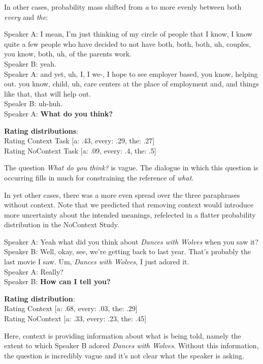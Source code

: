 \documentclass[12pt,letterpaper,table,svgnames,dvipsnames]{article}
\begin{document}
In other cases, probability mass shifted from \emph{a} to more evenly between both \emph{every} and \emph{the}:
\begin{exe}
    \ex {}
    \begin{xlist}
    \ex {}
    Speaker A: I mean, I'm just thinking of my circle of people that I know, I know quite a few people who have decided to not have both, both, both, uh, couples, you know, both, uh, of the parents work.\\
    Speaker B: yeah.\\
    Speaker A: and yet, uh, I, I we-, I hope to see employer based, you know, helping out. you know, child, uh, care centers at the place of employment and, and things like that, that will help out.\\
    Spealer B: uh-huh.\\
    Speaker A: \textbf{What do you think?}
    
    \ex \textbf{Rating distributions}:\\
    Rating Context Task [a: .43, every: .29, the: .27]\\
    Rating NoContext Task [a: .09, every: .4, the: .5]
    \end{xlist}
\end{exe}
The question \emph{What do you think?} is vague. The dialogue in which this question is occurring fills in much for constraining the reference of \emph{what}. 


In yet other cases, there was a more even spread over the three paraphrases without context. Note that we predicted that removing context would introduce more uncertainty about the intended meanings, refelected in a flatter probability distribution in the NoContext Study. 
\begin{exe}
    \ex {}
    \begin{xlist}
    \ex {}
    Speaker A: Yeah what did you think about \emph{Dances with Wolves} when you saw it?\\
    Speaker B: Well, okay, see, we're getting back to last year. That's probably the last movie I saw. Um, \emph{Dances with Wolves}, I just adored it.\\
    Speaker A: Really?\\
    Speaker B: \textbf{How can I tell you?}
    
    \ex \textbf{Rating distribution}:\\
    Rating Context [a: .68, every: .03, the: .29]\\
    Rating NoContext [a: .33, every: .23, the: .45] 
    \end{xlist}
\end{exe}
Here, context is providing information about what is being told, namely the extent to which Speaker B adored \emph{Dances with Wolves}. Without this information, the question is incredibly vague and it's not clear what the speaker is asking.
\end{document}
